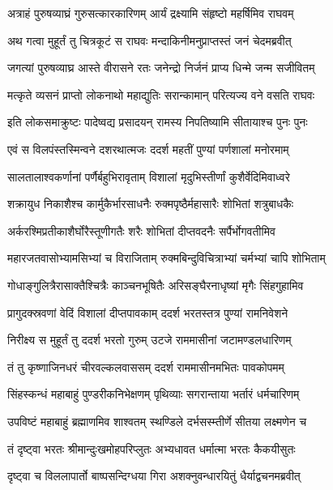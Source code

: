 \twolineshloka
{अत्राहं पुरुषव्याघ्रं गुरुसत्कारकारिणम्}
{आर्यं द्रक्ष्यामि संहृष्टो महर्षिमिव राघवम्} %

\twolineshloka
{अथ गत्वा मुहूर्तं तु चित्रकूटं स राघवः}
{मन्दाकिनीमनुप्राप्तस्तं जनं चेदमब्रवीत्} %

\twolineshloka
{जगत्यां पुरुषव्याघ्र आस्ते वीरासने रतः}
{जनेन्द्रो निर्जनं प्राप्य धिन्मे जन्म सजीवितम्} %

\twolineshloka
{मत्कृते व्यसनं प्राप्तो लोकनाथो महाद्युतिः}
{सरान्कामान् परित्यज्य वने वसति राघवः} %

\twolineshloka
{इति लोकसमाक्रुष्टः पादेष्वद्य प्रसादयन्}
{रामस्य निपतिष्यामि सीतायाश्च पुनः पुनः} %

\twolineshloka
{एवं स विलपंस्तस्मिन्वने दशरथात्मजः}
{ददर्श महतीं पुण्यां पर्णशालां मनोरमाम्} %

\twolineshloka
{सालतालाश्वकर्णानां पर्णैर्बहुभिरावृताम्}
{विशालां मृदुभिस्तीर्णां कुशैर्वेदिमिवाध्वरे} %

\twolineshloka
{शक्रायुध निकाशैश्च कार्मुकैर्भारसाधनैः}
{रुक्मपृष्ठैर्महासारैः शोभितां शत्रुबाधकैः} %

\twolineshloka
{अर्करश्मिप्रतीकाशैर्घोरैस्तूणीगतैः शरैः}
{शोभितां दीप्तवदनैः सर्पैर्भोगवतीमिव} %

\twolineshloka
{महारजतवासोभ्यामसिभ्यां च विराजिताम्}
{रुक्मबिन्दुविचित्राभ्यां चर्मभ्यां चापि शोभिताम्} %

\twolineshloka
{गोधाङ्गुलित्रैरासाक्तैश्चित्रैः काञ्चनभूषितैः}
{अरिसङ्घैरनाधृष्यां मृगैः सिंहगुहामिव} %

\twolineshloka
{प्रागुदक्स्रवणां वेदिं विशालां दीप्तपावकाम्}
{ददर्श भरतस्तत्र पुण्यां रामनिवेशने} %

\twolineshloka
{निरीक्ष्य स मुहूर्तं तु ददर्श भरतो गुरुम्}
{उटजे राममासीनां जटामण्डलधारिणम्} %

\twolineshloka
{तं तु कृष्णाजिनधरं चीरवल्कलवाससम्}
{ददर्श राममासीनमभितः पावकोपमम्} %

\twolineshloka
{सिंहस्कन्धं महाबाहुं पुण्डरीकनिभेक्षणम्}
{पृथिव्याः सगरान्ताया भर्तारं धर्मचारिणम्} %

\twolineshloka
{उपविष्टं महाबाहुं ब्रह्माणमिव शाश्वतम्}
{स्थण्डिले दर्भसस्म्तीर्णे सीतया लक्ष्मणेन च} %

\twolineshloka
{तं दृष्ट्वा भरतः श्रीमान्दुःखमोहपरिप्लुतः}
{अभ्यधावत धर्मात्मा भरतः कैकयीसुतः} %

\twolineshloka
{दृष्ट्वा च विललापार्तो बाष्पसन्दिग्धया गिरा}
{अशक्नुवन्धारयितुं धैर्याद्वचनमब्रवीत्} %

